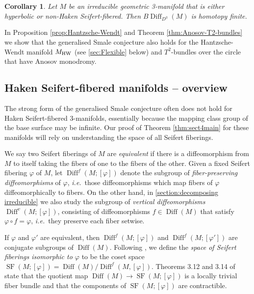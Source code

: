 \documentclass{amsart}
\theoremstyle{plain}
\newtheorem{cor}[thm]{Corollary}
\theoremstyle{definition}
\DeclareMathOperator\Diff{Diff}
\DeclareMathOperator{\SF}{SF}
\newcommand{\BDiff}{B\!\Diff}
\begin{document}
\begin{cor}\label{cor:NonHaken-and-Hyperbolic}
    Let $M$ be an irreducible geometric 3-manifold that is either hyperbolic or non-Haken Seifert-fibered. Then $\BDiff_{D^3}(M)$ is homotopy finite.
\end{cor}

In Proposition \ref{prop:Hantzsche-Wendt} and Theorem \ref{thm:Anosov-T2-bundles} we show that the generalised Smale conjecture also holds for the Hantzsche-Wendt manifold $M_{\rm HW}$ (see \cref{sec:Flexible} below) and $T^2$-bundles over the circle that have Anosov monodromy.


\subsection{Haken Seifert-fibered manifolds -- overview}\label{sec:HakenSF}

The strong form of the generalised Smale conjecture often does not hold for Haken Seifert-fibered 3-manifolds, essentially because the mapping class group of the base surface may be infinite. Our proof of Theorem \ref{thm:sect4main} for these manifolds will rely on understanding the space of all Seifert fiberings.  

We say two Seifert fiberings of $M$ are  \emph{equivalent} if there is a diffeomorphism from $M$ to itself taking the fibers of one to the fibers of the other. 
Given a fixed Seifert fibering $\varphi$ of $M$, let $\Diff^f(M;[\varphi])$ denote the subgroup of \emph{fiber-preserving diffeomorphisms} of $\varphi$, \emph{i.e.}~those diffeomorphisms which map fibers of $\varphi$ diffeomorphically to fibers. On the other hand, in \cref{section:decomposing irreducible} we also study the subgroup of \emph{vertical diffeomorphisms} $\Diff^v(M;[\varphi])$, consisting of diffeomorphisms $f \in \Diff(M)$ that satisfy $\varphi \circ f = \varphi$, \emph{i.e.}~they preserve each fiber setwise.  


If $\varphi$ and $\varphi'$ are equivalent, then $\Diff^f(M;[\varphi])$ and $\Diff^f(M;[\varphi'])$ are conjugate subgroups of $\Diff(M)$. Following \cite[Definition 3.13]{HKMR12}, we define the \emph{space of Seifert fiberings isomorphic to $\varphi$} to be the coset space $\SF(M;[\varphi])=\Diff(M)/\Diff^f(M,[\varphi])$. Theorems 3.12 and 3.14 of \cite{HKMR12} state that the quotient map $\Diff(M)\rightarrow \SF(M;[\varphi])$ is a locally trivial fiber bundle and that the components of $\SF(M;[\varphi])$ are contractible. 
\end{document}
